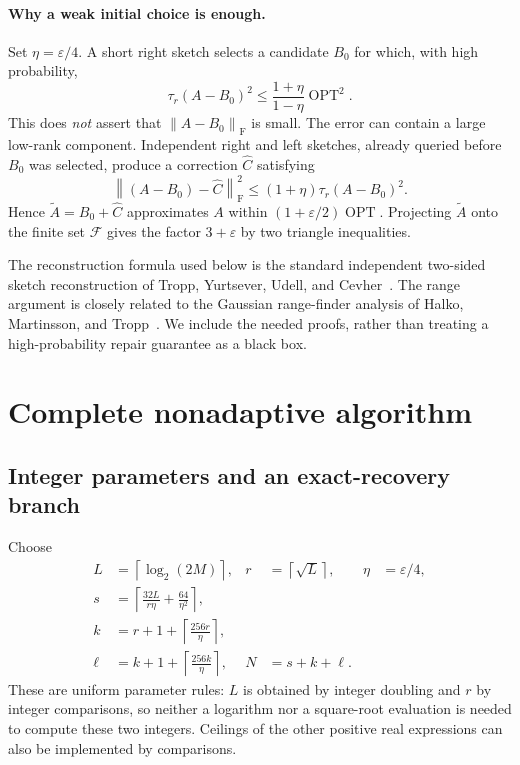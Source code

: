 \documentclass[11pt]{article}
\numberwithin{equation}{section}
\theoremstyle{remark}
\newcommand{\F}{\mathcal F}
\newcommand{\OPT}{\operatorname{OPT}}
\newcommand{\norm}[1]{\left\lVert #1\right\rVert_{\mathrm F}}
\newcommand{\ceil}[1]{\left\lceil #1\right\rceil}
\begin{document}
\paragraph{Why a weak initial choice is enough.}
Set $\eta=\varepsilon/4$. A short right sketch selects a candidate $B_0$ for which, with high probability,
\begin{equation}\label{eq:roadmap-tail}
 \tau_r(A-B_0)^2\le\frac{1+\eta}{1-\eta}\OPT^2.
\end{equation}
This does \emph{not} assert that $\norm{A-B_0}$ is small. The error can contain a large low-rank component. Independent right and left sketches, already queried before $B_0$ was selected, produce a correction $\widehat C$ satisfying
\begin{equation}\label{eq:roadmap-repair}
 \norm{(A-B_0)-\widehat C}^2\le(1+\eta)\tau_r(A-B_0)^2.
\end{equation}
Hence $\widetilde A=B_0+\widehat C$ approximates $A$ within
$(1+\varepsilon/2)\OPT$. Projecting $\widetilde A$ onto the finite set $\F$ gives the factor $3+\varepsilon$ by two triangle inequalities.

The reconstruction formula used below is the standard independent two-sided sketch reconstruction of Tropp, Yurtsever, Udell, and Cevher~\cite{tropp}. The range argument is closely related to the Gaussian range-finder analysis of Halko, Martinsson, and Tropp~\cite{hmt}. We include the needed proofs, rather than treating a high-probability repair guarantee as a black box.

\section{Complete nonadaptive algorithm}\label{sec:algorithm}

\subsection{Integer parameters and an exact-recovery branch}
Choose
\begin{align}
 L&=\ceil{\log_2(2M)}, & r&=\ceil{\sqrt L}, & \eta&=\varepsilon/4,\label{eq:basicparams}\\
 s&=\ceil{\frac{32L}{r\eta}+\frac{64}{\eta^2}},\label{eq:sparam}\\
 k&=r+1+\ceil{\frac{256r}{\eta}},\label{eq:kparam}\\
 \ell&=k+1+\ceil{\frac{256k}{\eta}}, & N&=s+k+\ell.\label{eq:ellparam}
\end{align}
These are uniform parameter rules: $L$ is obtained by integer doubling and $r$ by integer comparisons, so neither a logarithm nor a square-root evaluation is needed to compute these two integers. Ceilings of the other positive real expressions can also be implemented by comparisons.
\end{document}
